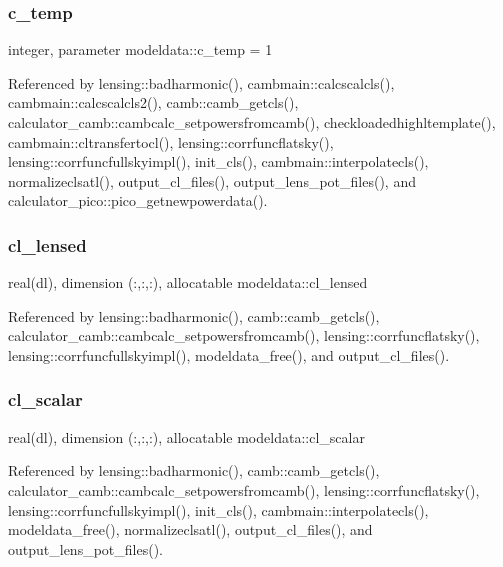 \subsubsection{\texorpdfstring{c\+\_\+temp}{c\_temp}}
{\footnotesize\ttfamily integer, parameter modeldata\+::c\+\_\+temp = 1}



Referenced by lensing\+::badharmonic(), cambmain\+::calcscalcls(), cambmain\+::calcscalcls2(), camb\+::camb\+\_\+getcls(), calculator\+\_\+camb\+::cambcalc\+\_\+setpowersfromcamb(), checkloadedhighltemplate(), cambmain\+::cltransfertocl(), lensing\+::corrfuncflatsky(), lensing\+::corrfuncfullskyimpl(), init\+\_\+cls(), cambmain\+::interpolatecls(), normalizeclsatl(), output\+\_\+cl\+\_\+files(), output\+\_\+lens\+\_\+pot\+\_\+files(), and calculator\+\_\+pico\+::pico\+\_\+getnewpowerdata().

\mbox{\label{namespacemodeldata_aa6168a25119bd0a5064f367267954562}} 
\subsubsection{\texorpdfstring{cl\+\_\+lensed}{cl\_lensed}}
{\footnotesize\ttfamily real(dl), dimension (\+:,\+:,\+:), allocatable modeldata\+::cl\+\_\+lensed}



Referenced by lensing\+::badharmonic(), camb\+::camb\+\_\+getcls(), calculator\+\_\+camb\+::cambcalc\+\_\+setpowersfromcamb(), lensing\+::corrfuncflatsky(), lensing\+::corrfuncfullskyimpl(), modeldata\+\_\+free(), and output\+\_\+cl\+\_\+files().

\mbox{\label{namespacemodeldata_a1d7527074ae8035793a2d9cf5cb4a8e8}} 
\subsubsection{\texorpdfstring{cl\+\_\+scalar}{cl\_scalar}}
{\footnotesize\ttfamily real(dl), dimension (\+:,\+:,\+:), allocatable modeldata\+::cl\+\_\+scalar}



Referenced by lensing\+::badharmonic(), camb\+::camb\+\_\+getcls(), calculator\+\_\+camb\+::cambcalc\+\_\+setpowersfromcamb(), lensing\+::corrfuncflatsky(), lensing\+::corrfuncfullskyimpl(), init\+\_\+cls(), cambmain\+::interpolatecls(), modeldata\+\_\+free(), normalizeclsatl(), output\+\_\+cl\+\_\+files(), and output\+\_\+lens\+\_\+pot\+\_\+files().

